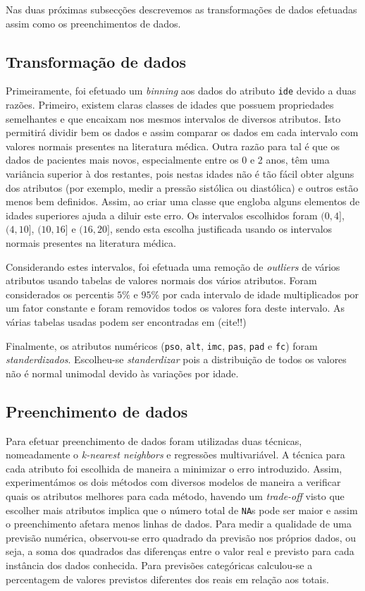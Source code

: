 \documentclass[10pt, conference, compsocconf]{IEEEtran}
\begin{document}
Nas duas próximas subsecções descrevemos as transformações de dados
efetuadas assim como os preenchimentos de dados.


\subsection{Transformação de dados}

Primeiramente, foi efetuado um \textit{binning} aos dados do atributo
{\tt ide} devido a duas razões. Primeiro, existem claras classes de
idades que possuem propriedades semelhantes e que encaixam nos mesmos
intervalos de diversos atributos. Isto permitirá dividir bem os dados
e assim comparar os dados em cada intervalo com valores normais
presentes na literatura médica. Outra razão para tal é que os dados de
pacientes mais novos, especialmente entre os 0 e 2 anos, têm uma
variância superior à dos restantes, pois nestas idades não é tão fácil
obter alguns dos atributos (por exemplo, medir a pressão sistólica ou
diastólica) e outros estão menos bem definidos. Assim, ao criar uma
classe que engloba alguns elementos de idades superiores ajuda a
diluir este erro. Os intervalos escolhidos foram $(0,4]$, $(4,10]$,
$(10,16]$ e $(16,20]$, sendo esta escolha justificada usando os
intervalos normais presentes na literatura médica.

Considerando estes intervalos, foi efetuada uma remoção de
\textit{outliers} de vários atributos usando tabelas de valores
normais dos vários atributos. Foram considerados os percentis $5\%$ e
$95\%$ por cada intervalo de idade multiplicados por um fator
constante e foram removidos todos os valores fora deste intervalo. As
várias tabelas usadas podem ser encontradas em (cite!!)

Finalmente, os atributos numéricos ({\tt pso}, {\tt alt}, {\tt imc},
{\tt pas}, {\tt pad} e {\tt fc}) foram
\textit{standerdizados}. Escolheu-se \textit{standerdizar} pois a
distribuição de todos os valores não é normal unimodal devido às
variações por idade.


\subsection{Preenchimento de dados}
Para efetuar preenchimento de dados foram utilizadas duas técnicas,
nomeadamente o \textit{k-nearest neighbors} e regressões
multivariável. A técnica para cada atributo foi escolhida de maneira a
minimizar o erro introduzido. Assim, experimentámos os dois métodos
com diversos modelos de maneira a verificar quais os atributos
melhores para cada método, havendo um \textit{trade-off} visto que
escolher mais atributos implica que o número total de {\tt NA}s pode
ser maior e assim o preenchimento afetara menos linhas de dados. Para
medir a qualidade de uma previsão numérica, observou-se erro quadrado
da previsão nos próprios dados, ou seja, a soma dos quadrados das
diferenças entre o valor real e previsto para cada instância dos dados
conhecida. Para previsões categóricas calculou-se a percentagem de
valores previstos diferentes dos reais em relação aos totais.
\end{document}
